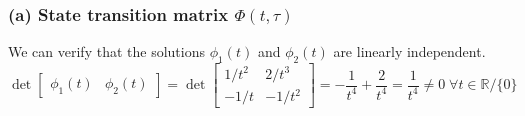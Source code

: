 \subsubsection*{(a) State transition matrix \( \Phi(t,\tau) \)}

We can verify that the solutions \( \phi_1(t) \) and \( \phi_2(t) \) are linearly independent.
\begin{equation*}
    \det \begin{bmatrix}
        \phi_1(t) & \phi_2(t)
    \end{bmatrix}
    =
    \det \begin{bmatrix}
        1/t^2 & 2/t^3  \\
        -1/t  & -1/t^2
    \end{bmatrix}
    =
    - \frac{1}{t^4} + \frac{2}{t^4}
    =
    \frac{1}{t^4}
    \neq 0
    \; \forall t \in \mathbb{R}/\{0\}
\end{equation*}

